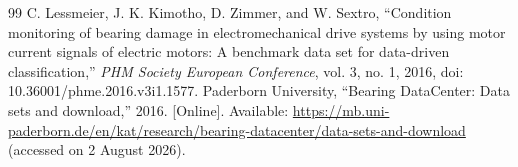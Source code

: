 \documentclass[machines,article,submit,oneauthor,pdftex]{Definitions/mdpi}
\begin{document}
\begin{thebibliography}{99}
 C. Lessmeier, J. K. Kimotho, D. Zimmer, and W. Sextro, ``Condition monitoring of bearing damage in electromechanical drive systems by using motor current signals of electric motors: A benchmark data set for data-driven classification,'' \emph{PHM Society European Conference}, vol. 3, no. 1, 2016, doi: 10.36001/phme.2016.v3i1.1577.
 Paderborn University, ``Bearing DataCenter: Data sets and download,'' 2016. [Online]. Available: \url{https://mb.uni-paderborn.de/en/kat/research/bearing-datacenter/data-sets-and-download} (accessed on 2 August 2026).

\end{thebibliography}
\end{document}
